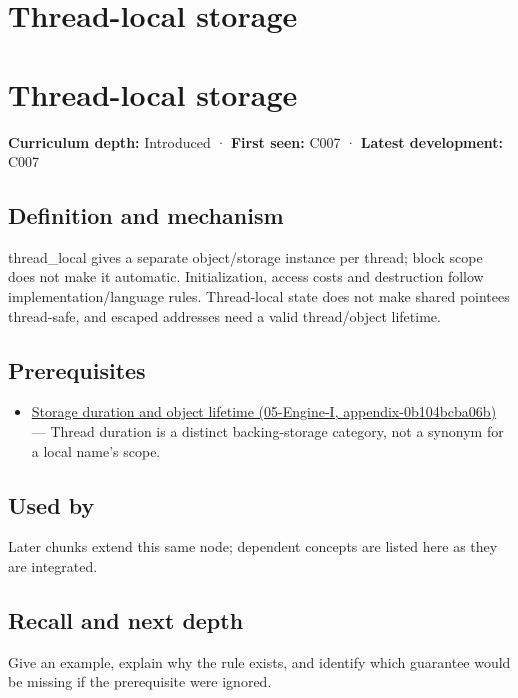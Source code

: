 \hypertarget{appendix-3b88c6cd7195}{}
\section*{Thread-local storage}
\section{Thread-local storage}\label{thread-local-storage}

\textbf{Curriculum depth:} Introduced · \textbf{First seen:} C007 · \textbf{Latest development:} C007

\subsection{Definition and mechanism}\label{definition-and-mechanism}

thread\_local gives a separate object/storage instance per thread; block scope does not make it automatic. Initialization, access costs and destruction follow implementation/language rules. Thread-local state does not make shared pointees thread-safe, and escaped addresses need a valid thread/object lifetime.

\subsection{Prerequisites}\label{prerequisites}

\begin{itemize}
\tightlist
\item
  \href{}{Storage duration and object lifetime (05-Engine-I, appendix-0b104bcba06b)} --- Thread duration is a distinct backing-storage category, not a synonym for a local name's scope.
\end{itemize}

\subsection{Used by}\label{used-by}

Later chunks extend this same node; dependent concepts are listed here as they are integrated.

\subsection{Recall and next depth}\label{recall-and-next-depth}

Give an example, explain why the rule exists, and identify which guarantee would be missing if the prerequisite were ignored.

